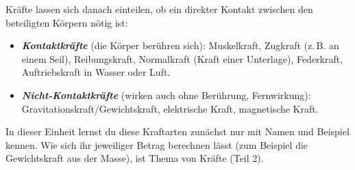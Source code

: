 \documentclass[addpoints,11pt,a4paper]{exam}
\begin{document}
\begin{theoriebox}
Kräfte lassen sich danach einteilen, ob ein direkter Kontakt zwischen den
beteiligten Körpern nötig ist:

\begin{itemize}[leftmargin=1.2cm,itemsep=0.3em]
  \item \textbf{\emph{Kontaktkräfte}} (die Körper berühren sich):
  Muskelkraft, Zugkraft (z.\,B. an einem Seil), Reibungskraft, Normalkraft
  (Kraft einer Unterlage), Federkraft, Auftriebskraft in Wasser oder Luft.
  \item \textbf{\emph{Nicht-Kontaktkräfte}} (wirken auch ohne Berührung,
  \glqq Fernwirkung\grqq{}): Gravitationskraft/Gewichtskraft, elektrische
  Kraft, magnetische Kraft.
\end{itemize}

In dieser Einheit lernst du diese Kraftarten zunächst nur mit Namen und
Beispiel kennen. Wie sich ihr jeweiliger Betrag berechnen lässt (zum
Beispiel die Gewichtskraft aus der Masse), ist Thema von Kräfte (Teil 2).
\end{theoriebox}
\end{document}
